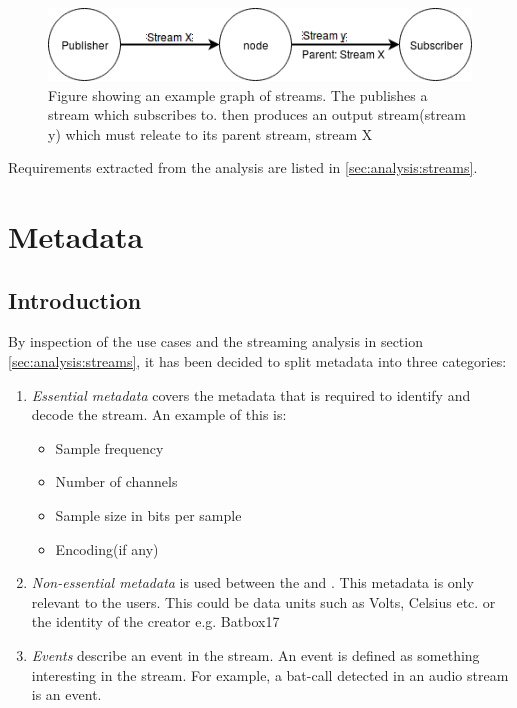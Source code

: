 \begin{figure}[h!]
	\centering
	\includegraphics[width=1\textwidth]{figures/stream-graph}
	\caption{Figure showing an example graph of streams. The  publishes a stream which  subscribes to.  then produces an output stream(stream y) which must releate to its parent stream, stream X} \label{fig:analysis:graph}
\end{figure}

Requirements extracted from the analysis are listed in \ref{sec:analysis:streams}.

\section{Metadata} \label{sec:analysis:metadata}
\subsection{Introduction}

By inspection of the use cases and the streaming analysis in section \ref{sec:analysis:streams}, it has been decided to split metadata into three categories:
\begin{enumerate}
	\item \textit{Essential metadata} covers the metadata that is required to identify and decode the stream.
		An example of this is:
		\begin{itemize}
			\item Sample frequency
			\item Number of channels
			\item Sample size in bits per sample
			\item Encoding(if any)
		\end{itemize}
	\item \textit{Non-essential metadata} is used between the  and . This metadata is only relevant to the users. This could be data units such as Volts, Celsius etc. or the identity of the creator e.g. Batbox17
	\item \textit{Events} describe an event in the stream. An event is defined as something interesting in the stream. For example, a bat-call detected in an audio stream is an event.
\end{enumerate}


